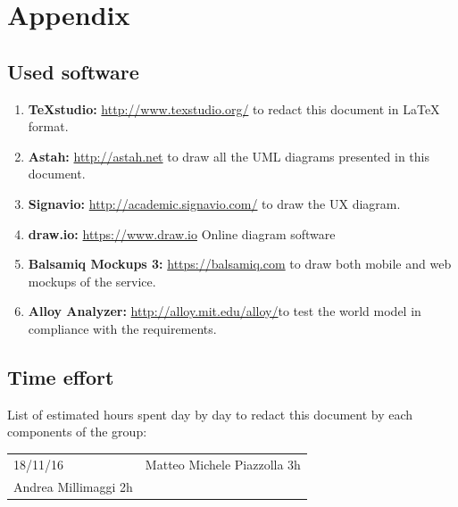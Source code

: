 \documentclass[english]{article}
\providecommand{\tabularnewline}{\\}
\newcounter{requirement}
\begin{document}
	\newpage{}
	
	
	\pagebreak
	
	\pagebreak
	
	\pagebreak
	
	\pagebreak
	
	\pagebreak
	\section{Appendix}
	
	\subsection{Used software}
	\begin{enumerate}
		\item \textbf{TeXstudio:} \url{http://www.texstudio.org/} to redact this document in {\LaTeX} format.
		\item \textbf{Astah:} \url{http://astah.net} to draw all the UML diagrams presented in this document.
		\item \textbf{Signavio:} \url{http://academic.signavio.com/} to draw the UX diagram.
		\item \textbf{draw.io:} \url{https://www.draw.io} Online diagram software
		\item \textbf{Balsamiq Mockups 3:} \url{https://balsamiq.com} to draw both mobile and web mockups of the service.
		\item \textbf{Alloy Analyzer:}  \url{http://alloy.mit.edu/alloy/}to test the world model in compliance with the requirements.
	\end{enumerate}
	
	\subsection{Time effort}
	List of estimated hours spent day by day to redact this document by each components of the group:
	\begin{center}
		\begin{adjustbox}{max width=\textwidth}	
			\begin{tabular}{|l|>{\raggedright}p{15cm}|}
      \hline  18/11/16 & Matteo Michele Piazzolla 3h \\ Andrea Millimaggi 2h \tabularnewline

				
				
				\hline 
			\end{tabular}
		\end{adjustbox}
	\end{center}	
	
	
\end{document}
